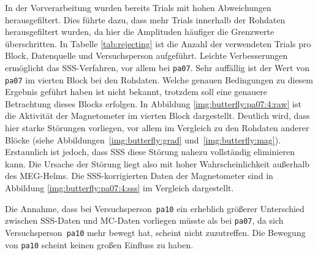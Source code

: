 \documentclass[doc,a4paper,12pt]{apa6}
\begin{document}
In der Vorverarbeitung wurden bereits Trials mit hohen Abweichungen herausgefiltert. Dies führte dazu, dass mehr Trials innerhalb der Rohdaten herausgefiltert wurden, da hier die Amplituden häufiger die Grenzwerte überschritten. In Tabelle \ref{tab:rejecting} ist die Anzahl der verwendeten Trials pro Block, Datenquelle und Versuchsperson aufgeführt. Leichte Verbesserungen ermöglicht das SSS-Verfahren, vor allem bei \texttt{pa07}. Sehr auffällig ist der Wert von \texttt{pa07} im vierten Block bei den Rohdaten. Welche genauen Bedingungen zu diesem Ergebnis geführt haben ist nicht bekannt, trotzdem soll eine genauere Betrachtung dieses Blocks erfolgen. In Abbildung \ref{img:butterfly:pa07:4:raw} ist die Aktivität der Magnetometer im vierten Block dargestellt. Deutlich wird, dass hier starke Störungen vorliegen, vor allem im Vergleich zu den Rohdaten anderer Blöcke (siehe Abbildungen~\ref{img:butterfly:grad} und~\ref{img:butterfly:mag}). Erstaunlich ist jedoch, dass SSS diese Störung nahezu vollständig eliminieren kann. Die Ursache der Störung liegt also mit hoher Wahrscheinlichkeit außerhalb des MEG-Helms. Die SSS-korrigierten Daten der Magnetometer sind in Abbildung \ref{img:butterfly:pa07:4:sss} im Vergleich dargestellt.

Die Annahme, dass bei Versuchsperson~\texttt{pa10} ein erheblich größerer Unterschied zwischen SSS-Daten und MC-Daten vorliegen müsste als bei \texttt{pa07}, da sich Versuchsperson~\texttt{pa10} mehr bewegt hat, scheint nicht zuzutreffen. Die Bewegung von \texttt{pa10} scheint keinen großen Einfluss zu haben. 
\end{document}
